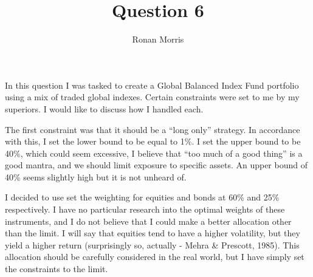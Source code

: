 \documentclass[11pt,preprint, authoryear]{elsarticle}
\numberwithin{equation}{section}
\numberwithin{figure}{section}
\numberwithin{table}{section}
\begin{document}
\begin{frontmatter}  %

\title{Question 6}





\author[Add1]{Ronan Morris}





\address[Add1]{Stellenbosch University}



\vspace{1cm}





\vspace{0.5cm}

\end{frontmatter}

\setcounter{footnote}{0}



\pagestyle{fancy}
\chead{}
\rhead{}
\lfoot{}
\lhead{}
\cfoot{}


\headsep 35pt %




In this question I was tasked to create a Global Balanced Index Fund
portfolio using a mix of traded global indexes. Certain constraints were
set to me by my superiors. I would like to discuss how I handled each.

The first constraint was that it should be a ``long only'' strategy. In
accordance with this, I set the lower bound to be equal to 1\%. I set
the upper bound to be 40\%, which could seem excessive, I believe that
``too much of a good thing'' is a good mantra, and we should limit
exposure to specific assets. An upper bound of 40\% seems slightly high
but it is not unheard of.

I decided to use set the weighting for equities and bonds at 60\% and
25\% respectively. I have no particular research into the optimal
weights of these instruments, and I do not believe that I could make a
better allocation other than the limit. I will say that equities tend to
have a higher volatility, but they yield a higher return (surprisingly
so, actually - Mehra \& Prescott, 1985). This allocation should be
carefully considered in the real world, but I have simply set the
constraints to the limit.
\end{document}
